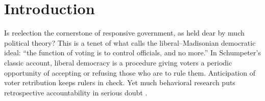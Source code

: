 \documentclass[letter,12pt]{article}
\begin{document}



\doublespacing

\section{Introduction}

Is reelection the cornerstone of responsive government, as held dear by much political theory? This is a tenet of what \citet[][:9]{riker.lib.pop.1978} calls the liberal--Madisonian democratic ideal: ``the function of voting is to control officials, and no more.'' In Schumpeter's \citeyearpar{schumpeter.1942} classic account, liberal democracy is a procedure giving voters a periodic opportunity of accepting or refusing those who are to rule them. Anticipation of voter retribution keeps rulers in check. Yet much behavioral research puts retrospective accountability in serious doubt \citep{achen.bartels.Dem.real.2016}.

\end{document}
